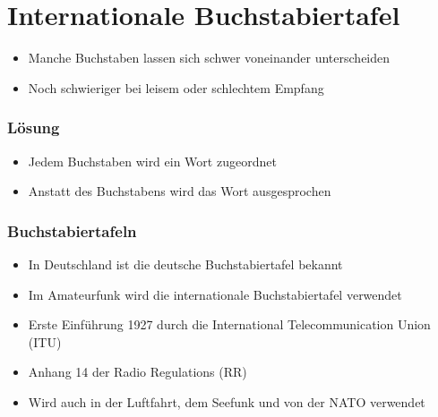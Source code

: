 
\section{Internationale Buchstabiertafel}
\label{section:buchstabiertafel}
\begin{frame}%
\begin{itemize}
  \item Manche Buchstaben lassen sich schwer voneinander unterscheiden
  \item Noch schwieriger bei leisem oder schlechtem Empfang
  \end{itemize}

\end{frame}

\begin{frame}
\frametitle{Lösung}
\begin{itemize}
  \item Jedem Buchstaben wird ein Wort zugeordnet
  \item Anstatt des Buchstabens wird das Wort ausgesprochen
  \end{itemize}
\end{frame}

\begin{frame}
\frametitle{Buchstabiertafeln}
\begin{itemize}
  \item In Deutschland ist die deutsche Buchstabiertafel bekannt
  \item Im Amateurfunk wird die internationale Buchstabiertafel verwendet
  \item Erste Einführung 1927 durch die International Telecommunication Union (ITU)
  \item Anhang 14 der Radio Regulations (RR)
  \item Wird auch in der Luftfahrt, dem Seefunk und von der NATO verwendet
  \end{itemize}

\end{frame}


